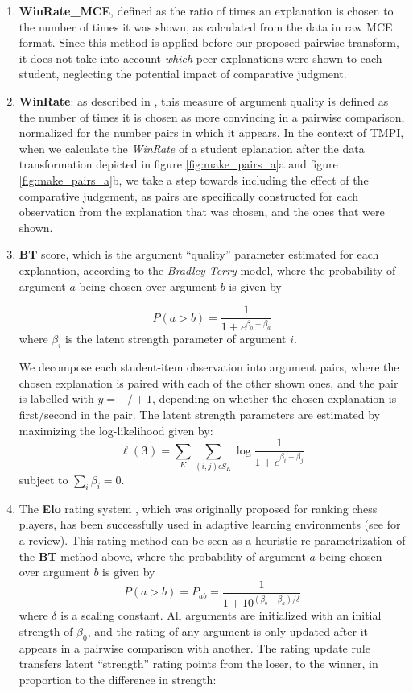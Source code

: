 \documentclass[notitlepage,12pt]{jedm}
\begin{document}
\begin{enumerate}
	
	\item \textbf{WinRate\_MCE}, defined as the ratio of times an explanation 
	is chosen to the number of times it was shown, as calculated from the data 
	in raw MCE format.
	Since this method is applied before our proposed pairwise transform, it 
	does not take into account \textit{which} peer explanations were shown to 
	each student, neglecting the potential impact of comparative judgment.
	
	\item \textbf{WinRate}: as described in \cite{potash_ranking_2019}, this 
	measure of argument quality is defined as the number of times it is chosen 
	as more convincing in a pairwise comparison, normalized for the number 
	pairs in which it appears. 
	In the context of TMPI, when we calculate the \textit{WinRate} of a student 
	eplanation after the data transformation depicted in figure 
	\ref{fig:make_pairs_a}a and figure \ref{fig:make_pairs_a}b, we take a step 
	towards including the effect of the comparative judgement, as pairs are 
	specifically constructed for each observation from the explanation that was 
	chosen, and the ones that were shown.
	
	\item \textbf{BT} score, which is the argument ``quality'' parameter 
	estimated for each explanation, according to the \textit{Bradley-Terry} 
	model, where the probability of argument $a$ being chosen over argument $b$ 
	is given by 
	
	$$
	P(a>b) = 
	\frac{1}{1+e^{\beta_b-\beta_a}}
	$$
	where $\beta_i$ is the latent strength parameter of argument $i$.
	
	We decompose each student-item observation into argument pairs, where the 
	chosen explanation is paired with each of the other shown ones, and the 
	pair is labelled with $y=-/+1$, depending on whether the chosen explanation 
	is first/second in the pair.
	The latent strength parameters are estimated by maximizing 
	the log-likelihood given by:
	$$
	\ell(\boldsymbol{\beta})=\sum_{K}\sum_{(i,j)\epsilon S_K}^{} 
	\log\frac{1}{1+e^{\beta_i - \beta_j}}
	$$
	subject to $\sum_{i}\beta_i=0$.
	
	
	\item The \textbf{Elo} rating system \cite{elo_rating_1978}, which was 
	originally proposed for ranking chess players, has been successfully used 
	in adaptive learning environments (see \cite{pelanek_applications_2016} for 
	a review). 
	This rating method can be seen as a heuristic re-parametrization of the 
	\textbf{BT} method above, where the probability of argument $a$ being 
	chosen over argument $b$ is given by
	$$
	P(a>b) = P_{ab} = \frac{1}{1+10^{(\beta_b-\beta_a)/\delta}}
	$$
	where $\delta$ is a scaling constant. 
	All arguments are initialized with an initial strength of $\beta_0$, and 
	the rating of any argument is only updated after it appears in a pairwise 
	comparison with another.
	The rating update rule transfers latent ``strength'' rating points from the 
	loser, to the winner, in proportion to the difference in strength:
	

\end{enumerate}
\end{document}
